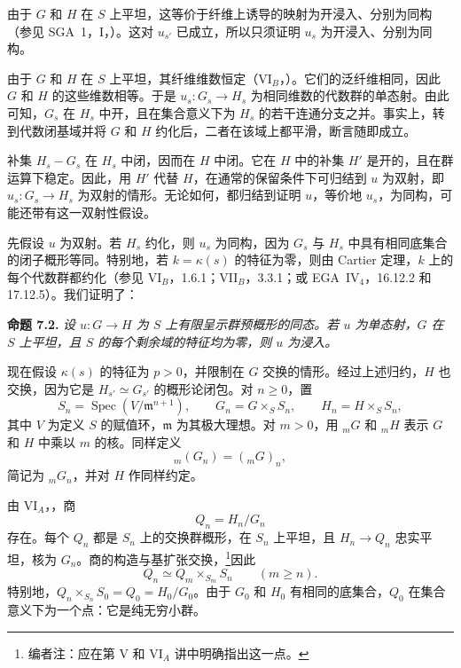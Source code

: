 由于 \(G\) 和 \(H\) 在 \(S\) 上平坦，这等价于纤维上诱导的映射为开浸入、分别为同构（参见 SGA~1，I，）。这对 \(u_{s'}\) 已成立，所以只须证明 \(u_s\) 为开浸入、分别为同构。

由于 \(G\) 和 \(H\) 在 \(S\) 上平坦，其纤维维数恒定（VI\(_B\)，）。它们的泛纤维相同，因此 \(G\) 和 \(H\) 的这些维数相等。于是 \(u_s:G_s\to H_s\) 为相同维数的代数群的单态射。由此可知，\(G_s\) 在 \(H_s\) 中开，且在集合意义下为 \(H_s\) 的若干连通分支之并。事实上，转到代数闭基域并将 \(G\) 和 \(H\) 约化后，二者在该域上都平滑，断言随即成立。

补集 \(H_s-G_s\) 在 \(H_s\) 中闭，因而在 \(H\) 中闭。它在 \(H\) 中的补集 \(H'\) 是开的，且在群运算下稳定。因此，用 \(H'\) 代替 \(H\)，在通常的保留条件下可归结到 \(u\) 为双射，即 \(u_s:G_s\to H_s\) 为双射的情形。无论如何，都归结到证明 \(u\)，等价地 \(u_s\)，为同构，可能还带有这一双射性假设。

先假设 \(u\) 为双射。若 \(H_s\) 约化，则 \(u_s\) 为同构，因为 \(G_s\) 与 \(H_s\) 中具有相同底集合的闭子概形等同。特别地，若 \(k=\kappa(s)\) 的特征为零，则由 Cartier 定理，\(k\) 上的每个代数群都约化（参见 VI\(_B\)，1.6.1；VII\(_B\)，3.3.1；或 EGA~IV\(_4\)，16.12.2 和 17.12.5）。我们证明了：

\medskip
\noindent{}\textbf{命题 7.2.}
\textit{设 \(u:G\to H\) 为 \(S\) 上有限呈示群预概形的同态。若 \(u\) 为单态射，\(G\) 在 \(S\) 上平坦，且 \(S\) 的每个剩余域的特征均为零，则 \(u\) 为浸入。}

现在假设 \(\kappa(s)\) 的特征为 \(p>0\)，并限制在 \(G\) 交换的情形。经过上述归约，\(H\) 也交换，因为它是 \(H_{s'}\simeq G_{s'}\) 的概形论闭包。对 \(n\geq0\)，置
\[
  S_n=\operatorname{Spec}(V/\mathfrak m^{n+1}),\qquad
  G_n=G\times_SS_n,\qquad H_n=H\times_SS_n,
\]
其中 \(V\) 为定义 \(S\) 的赋值环，\(\mathfrak m\) 为其极大理想。对 \(m>0\)，用 \({}_mG\) 和 \({}_mH\) 表示 \(G\) 和 \(H\) 中乘以 \(m\) 的核。同样定义
\[
  {}_m(G_n)=({}_mG)_n,
\]
简记为 \({}_mG_n\)，并对 \(H\) 作同样约定。

由 VI\(_A\)，，商
\[
  Q_n=H_n/G_n
\]
存在。每个 \(Q_n\) 都是 \(S_n\) 上的交换群概形，在 \(S_n\) 上平坦，且 \(H_n\to Q_n\) 忠实平坦，核为 \(G_n\)。商的构造与基扩张交换，\footnote{编者注：应在第 V 和 VI\(_A\) 讲中明确指出这一点。}因此
\[
  Q_n\simeq Q_m\times_{S_m}S_n\qquad(m\geq n).
\]
特别地，\(Q_n\times_{S_n}S_0=Q_0=H_0/G_0\)。由于 \(G_0\) 和 \(H_0\) 有相同的底集合，\(Q_0\) 在集合意义下为一个点：它是纯无穷小群。

